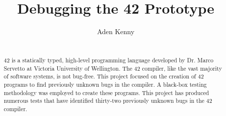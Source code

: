 \documentclass[11pt
              , a4paper
              , twoside
              , openright
              ]{report}
\title{Debugging the 42 Prototype}
\author{Aden Kenny}
\date{}
\begin{document}
\frontmatter



\begin{abstract}
~\\
42 is a statically typed, high-level programming language developed by Dr. Marco Servetto at Victoria University of Wellington. The 42 compiler, like the vast majority of software systems, is not bug-free. This project focused on the creation of 42 programs to find previously unknown bugs in the compiler. A black-box testing methodology was employed to create these programs. This project has produced numerous tests that have identified thirty-two previously unknown bugs in the 42 compiler.


\end{abstract}


\maketitle



\tableofcontents



\mainmatter
















\backmatter




%

\end{document}
